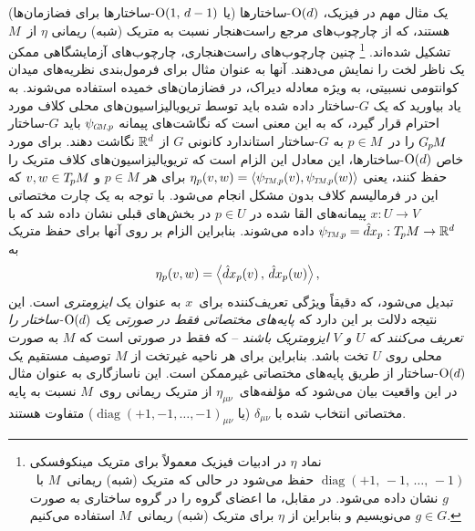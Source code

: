 یک مثال مهم در فیزیک، $\operatorname{O}(d)$-ساختارها (یا $\operatorname{O}(1,\, d-1)$-ساختارها برای فضازمان‌ها) هستند، که از چارچوب‌های مرجع راست‌هنجار نسبت به متریک (شبه) ریمانی $\eta$ از~$M$ تشکیل شده‌اند.%
\footnote{
	نماد $\eta$ در ادبیات فیزیک معمولاً برای متریک مینکوفسکی $\operatorname{diag}(+1,\, -1,\, \dots,\, -1)$ حفظ می‌شود در حالی که متریک (شبه) ریمانی~$M$ با~$g$ نشان داده می‌شود.
	در مقابل، ما اعضای گروه را در گروه ساختاری به صورت $g\in G$ می‌نویسیم و بنابراین از $\eta$ برای متریک (شبه) ریمانی~$M$ استفاده می‌کنیم.
}
چنین چارچوب‌های راست‌هنجاری، چارچوب‌های آزمایشگاهی ممکن یک ناظر لخت را نمایش می‌دهند.
آنها به عنوان مثال برای فرمول‌بندی نظریه‌های میدان کوانتومی نسبیتی، به ویژه معادله دیراک، در فضازمان‌های خمیده استفاده می‌شوند.
به یاد بیاورید که یک $G$-ساختار داده شده باید توسط تریویالیزاسیون‌های محلی کلاف مورد احترام قرار گیرد، که به این معنی است که نگاشت‌های پیمانه $\psiGMp$ باید $G$-ساختار $G_{\mkern-1.3mu p}\mkern-1.2muM$ را در~$p\in M$ به $G$-ساختار استاندارد کانونی $G$ از $\mathbb{R}^d$ نگاشت دهند.
برای مورد خاص $\operatorname{O}(d)$-ساختارها، این معادل این الزام است که تریویالیزاسیون‌های کلاف متریک را حفظ کنند، یعنی $\eta_p(v,w) = \langle \psiTMp(v), \psiTMp(w) \rangle$ برای هر $p\in M$ و $v,w \in T_{\mkern-1.5mu p}\mkern-.5muM$ که این در فرمالیسم کلاف بدون مشکل انجام می‌شود.
با توجه به یک چارت مختصاتی $x: U \to V$ پیمانه‌های القا شده در $p\in U$ در بخش‌های قبلی نشان داده شد که با $\psiTMp = \hat{d}x_p: \TpM \to \R^d$ داده می‌شوند.
بنابراین الزام بر روی آنها برای حفظ متریک به
\begin{align}
	\eta_p(v,w) = \pig\langle \hat{d}x_p(v) \,,\, \hat{d}x_p(w) \pig\rangle \,,
\end{align}
تبدیل می‌شود، که دقیقاً ویژگی تعریف‌کننده برای~$x$ به عنوان یک \emph{ایزومتری} است.
این نتیجه دلالت بر این دارد که \emph{پایه‌های مختصاتی فقط در صورتی یک $\operatorname{O}(d)$-ساختار را تعریف می‌کنند که $U$ و $V$ ایزومتریک باشند} -- که فقط در صورتی است که $M$ به صورت محلی روی $U$ تخت باشد.
بنابراین برای هر ناحیه غیرتخت از $M$ توصیف مستقیم یک $\operatorname{O}(d)$-ساختار از طریق پایه‌های مختصاتی غیرممکن است.
این ناسازگاری به عنوان مثال در این واقعیت بیان می‌شود که مؤلفه‌های~$\eta_{\mu\nu}$ از متریک ریمانی روی~$M$ نسبت به پایه مختصاتی انتخاب شده با $\delta_{\mu\nu}$ (یا $\operatorname{diag}(+1,-1,\dots,-1)_{\mu\nu}$) متفاوت هستند.

